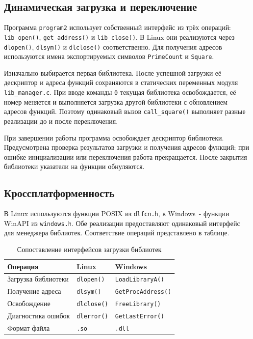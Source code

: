 \documentclass[12pt,a4paper]{article}
\begin{document}
\subsection{Динамическая загрузка и переключение}
Программа \texttt{program2} использует собственный интерфейс из трёх операций: \texttt{lib\_open()}, \texttt{get\_address()} и \texttt{lib\_close()}. В Linux они реализуются через \texttt{dlopen()}, \texttt{dlsym()} и \texttt{dlclose()} соответственно. Для получения адресов используются имена экспортируемых символов \texttt{PrimeCount} и \texttt{Square}.

Изначально выбирается первая библиотека. После успешной загрузки её дескриптор и адреса функций сохраняются в статических переменных модуля \texttt{lib\_manager.c}. При вводе команды \texttt{0} текущая библиотека освобождается, её номер меняется и выполняется загрузка другой библиотеки с обновлением адресов функций. Поэтому одинаковый вызов \texttt{call\_square()} выполняет разные реализации до и после переключения.

При завершении работы программа освобождает дескриптор библиотеки. Предусмотрена проверка результатов загрузки и получения адресов функций; при ошибке инициализации или переключения работа прекращается. После закрытия библиотеки указатели на функции обнуляются.

\subsection{Кроссплатформенность}
В Linux используются функции POSIX из \texttt{dlfcn.h}, в Windows~- функции WinAPI из \texttt{windows.h}. Обе реализации предоставляют одинаковый интерфейс для менеджера библиотек. Соответствие операций представлено в таблице.

\begin{table}[H]
\centering\small
\begin{tabular}{|p{48mm}|p{42mm}|p{50mm}|}
\hline
Операция & Linux & Windows \\
\hline
Загрузка библиотеки & \texttt{dlopen()} & \texttt{LoadLibraryA()} \\
Получение адреса & \texttt{dlsym()} & \texttt{GetProcAddress()} \\
Освобождение & \texttt{dlclose()} & \texttt{FreeLibrary()} \\
Диагностика ошибок & \texttt{dlerror()} & \texttt{GetLastError()} \\
Формат файла & \texttt{.so} & \texttt{.dll} \\
\hline
\end{tabular}
\caption{Сопоставление интерфейсов загрузки библиотек}
\end{table}
\end{document}
